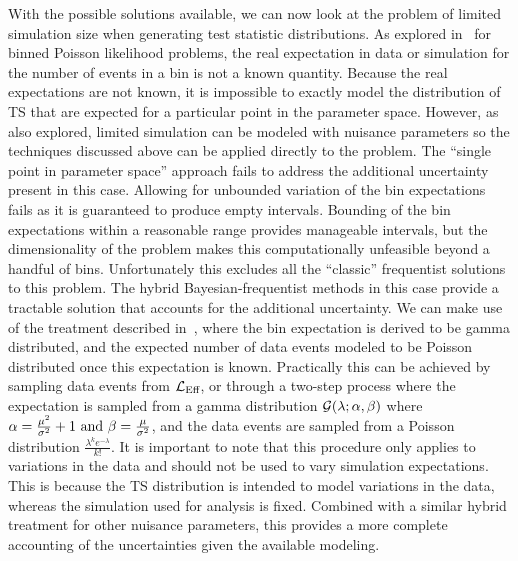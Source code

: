 With the possible solutions available, we can now look at the problem of limited simulation size when generating test statistic distributions.
As explored in~ for binned Poisson likelihood problems, the real expectation in data or simulation for the number of events in a bin is not a known quantity.
Because the real expectations are not known, it is impossible to exactly model the distribution of TS that are expected for a particular point in the parameter space.
However, as~ also explored, limited simulation can be modeled with nuisance parameters so the techniques discussed above can be applied directly to the problem.
The ``single point in parameter space'' approach fails to address the additional uncertainty present in this case.
Allowing for unbounded variation of the bin expectations fails as it is guaranteed to produce empty intervals.
Bounding of the bin expectations within a reasonable range provides manageable intervals, but the dimensionality of the problem makes this computationally unfeasible beyond a handful of bins.
Unfortunately this excludes all the ``classic'' frequentist solutions to this problem.
The hybrid Bayesian-frequentist methods in this case provide a tractable solution that accounts for the additional uncertainty.
We can make use of the treatment described in~, where the bin expectation is derived to be gamma distributed, and the expected number of data events modeled to be Poisson distributed once this expectation is known.
Practically this can be achieved by sampling data events from $\mathcal{L}_\textmd{Eff}$, or through a two-step process where the expectation is sampled from a gamma distribution $\mathcal{G}(\lambda;\alpha, \beta)$ where $\alpha = \frac{\mu^2}{\sigma^2}+1~\textmd{and}~\beta=\frac{\mu}{\sigma^2}$, and the data events are sampled from a Poisson distribution $\frac{\lambda^{k}e^{-\lambda}}{k!}$.
It is important to note that this procedure only applies to variations in the data and should not be used to vary simulation expectations.
This is because the TS distribution is intended to model variations in the data, whereas the simulation used for analysis is fixed.
Combined with a similar hybrid treatment for other nuisance parameters, this provides a more complete accounting of the uncertainties given the available modeling.